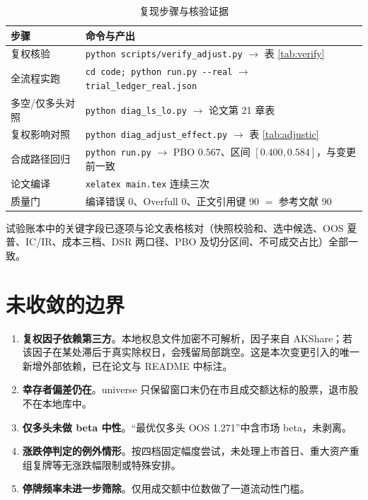 \documentclass[11pt,a4paper]{ctexart}
\begin{document}
\begin{table}[htbp]
\centering
\caption{复现步骤与核验证据}
\label{tab:repro}
\begin{tabular}{@{}>{\raggedright\arraybackslash}p{5.2cm}>{\raggedright\arraybackslash}p{9.2cm}@{}}
\toprule
步骤 & 命令与产出 \\
\midrule
复权核验 & \texttt{python scripts/verify\_adjust.py} $\rightarrow$ 表 \ref{tab:verify} \\
全流程实跑 & \texttt{cd code; python run.py {-}{-}real} $\rightarrow$ \texttt{trial\_ledger\_real.json} \\
多空/仅多头对照 & \texttt{python diag\_ls\_lo.py} $\rightarrow$ 论文第 21 章表 \\
复权影响对照 & \texttt{python diag\_adjust\_effect.py} $\rightarrow$ 表 \ref{tab:adjustic} \\
合成路径回归 & \texttt{python run.py} $\rightarrow$ PBO $0.567$、区间 $[0.400,0.584]$，与变更前一致 \\
论文编译 & \texttt{xelatex main.tex} 连续三次 \\
质量门 & 编译错误 0、Overfull 0、正文引用键 90 $=$ 参考文献 90 \\
\bottomrule
\end{tabular}
\end{table}

试验账本中的关键字段已逐项与论文表格核对（快照校验和、选中候选、OOS 夏普、IC/IR、成本三档、DSR 两口径、PBO 及切分区间、不可成交占比）全部一致。

\section{未收敛的边界}

\begin{enumerate}
  \item \textbf{复权因子依赖第三方}。本地权息文件加密不可解析，因子来自 AKShare；若该因子在某处滞后于真实除权日，会残留局部跳空。这是本次变更引入的唯一新增外部依赖，已在论文与 README 中标注。
  \item \textbf{幸存者偏差仍在}。universe 只保留窗口末仍在市且成交额达标的股票，退市股不在本地库中。
  \item \textbf{仅多头未做 beta 中性}。“最优仅多头 OOS 1.271”中含市场 beta，未剥离。
  \item \textbf{涨跌停判定的例外情形}。按四档固定幅度尝试，未处理上市首日、重大资产重组复牌等无涨跌幅限制或特殊安排。
  \item \textbf{停牌频率未进一步筛除}。仅用成交额中位数做了一道流动性门槛。
\end{enumerate}
\end{document}
